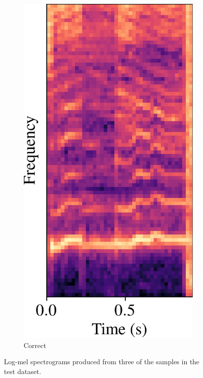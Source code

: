 \documentclass[conference]{IEEEtran}
\begin{document}
\begin{figure}[htbp]
\begin{subfigure}[b]{0.32\columnwidth}
    \end{subfigure}
    \hfill
    \begin{subfigure}[b]{0.32\columnwidth}
        \centerline{\includegraphics[width=\columnwidth]{spec_incorrect_2.png}}
        \caption{Correct}
        \label{spec_incorrect_2}
    \end{subfigure}
    \caption{Log-mel spectrograms produced from three of the samples in the test dataset.}
    \label{spectrograms}
\end{figure}
\end{document}
